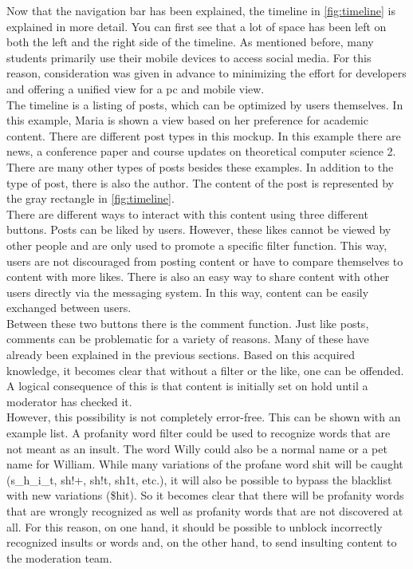 Now that the navigation bar has been explained, the timeline in \autoref{fig:timeline} is explained in more detail.
You can first see that a lot of space has been left on both the left and the right side of the timeline.
As mentioned before, many students primarily use their mobile devices to access social media.
For this reason, consideration was given in advance to minimizing the effort for developers and offering a unified view for a pc and mobile view.\\

The timeline is a listing of posts, which can be optimized by users themselves.
In this example, Maria is shown a view based on her preference for academic content.
There are different post types in this mockup.
In this example there are news, a conference paper and course updates on theoretical computer science 2.
There are many other types of posts besides these examples.
In addition to the type of post, there is also the author.
The content of the post is represented by the gray rectangle in \autoref{fig:timeline}.\\

There are different ways to interact with this content using three different buttons.
Posts can be liked by users.
However, these likes cannot be viewed by other people and are only used to promote a specific filter function.
This way, users are not discouraged from posting content or have to compare themselves to content with more likes.
There is also an easy way to share content with other users directly via the messaging system.
In this way, content can be easily exchanged between users.\\

Between these two buttons there is the comment function.
Just like posts, comments can be problematic for a variety of reasons.
Many of these have already been explained in the previous sections.
Based on this acquired knowledge, it becomes clear that without a filter or the like, one can be offended.
A logical consequence of this is that content is initially set on hold until a moderator has checked it.\\

However, this possibility is not completely error-free.
This can be shown with an example list\cite{profanity-list}.
A profanity word filter could be used to recognize words that are not meant as an insult.
The word Willy could also be a normal name or a pet name for William.
While many variations of the profane word shit will be caught (s\_h\_i\_t, sh!+, sh!t, sh1t, etc.), it will also be possible to bypass the blacklist with new variations (\$hit).
So it becomes clear that there will be profanity words that are wrongly recognized as well as profanity words that are not discovered at all.
For this reason, on one hand, it should be possible to unblock incorrectly recognized insults or words and, on the other hand, to send insulting content to the moderation team.\\


